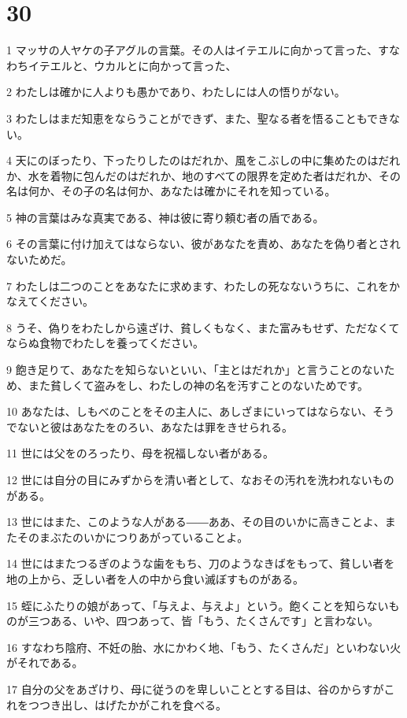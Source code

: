 \chapter{30}

\par 1 マッサの人ヤケの子アグルの言葉。その人はイテエルに向かって言った、すなわちイテエルと、ウカルとに向かって言った、
\par 2 わたしは確かに人よりも愚かであり、わたしには人の悟りがない。
\par 3 わたしはまだ知恵をならうことができず、また、聖なる者を悟ることもできない。
\par 4 天にのぼったり、下ったりしたのはだれか、風をこぶしの中に集めたのはだれか、水を着物に包んだのはだれか、地のすべての限界を定めた者はだれか、その名は何か、その子の名は何か、あなたは確かにそれを知っている。
\par 5 神の言葉はみな真実である、神は彼に寄り頼む者の盾である。
\par 6 その言葉に付け加えてはならない、彼があなたを責め、あなたを偽り者とされないためだ。
\par 7 わたしは二つのことをあなたに求めます、わたしの死なないうちに、これをかなえてください。
\par 8 うそ、偽りをわたしから遠ざけ、貧しくもなく、また富みもせず、ただなくてならぬ食物でわたしを養ってください。
\par 9 飽き足りて、あなたを知らないといい、「主とはだれか」と言うことのないため、また貧しくて盗みをし、わたしの神の名を汚すことのないためです。
\par 10 あなたは、しもべのことをその主人に、あしざまにいってはならない、そうでないと彼はあなたをのろい、あなたは罪をきせられる。
\par 11 世には父をのろったり、母を祝福しない者がある。
\par 12 世には自分の目にみずからを清い者として、なおその汚れを洗われないものがある。
\par 13 世にはまた、このような人がある――ああ、その目のいかに高きことよ、またそのまぶたのいかにつりあがっていることよ。
\par 14 世にはまたつるぎのような歯をもち、刀のようなきばをもって、貧しい者を地の上から、乏しい者を人の中から食い滅ぼすものがある。
\par 15 蛭にふたりの娘があって、「与えよ、与えよ」という。飽くことを知らないものが三つある、いや、四つあって、皆「もう、たくさんです」と言わない。
\par 16 すなわち陰府、不妊の胎、水にかわく地、「もう、たくさんだ」といわない火がそれである。
\par 17 自分の父をあざけり、母に従うのを卑しいこととする目は、谷のからすがこれをつつき出し、はげたかがこれを食べる。
